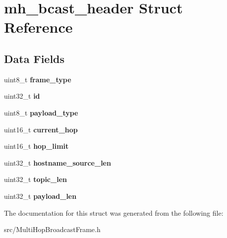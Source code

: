 \hypertarget{structmh__bcast__header}{\section{mh\-\_\-bcast\-\_\-header Struct Reference}
\label{structmh__bcast__header}
}
\subsection*{Data Fields}
\begin{DoxyCompactItemize}
\item 
\hypertarget{structmh__bcast__header_a645bc6e0f599ba87f09b808c7d132d68}{uint8\-\_\-t {\bfseries frame\-\_\-type}}\label{structmh__bcast__header_a645bc6e0f599ba87f09b808c7d132d68}

\item 
\hypertarget{structmh__bcast__header_aae2a3d39f8f9fa5b357e9689bc4d170c}{uint32\-\_\-t {\bfseries id}}\label{structmh__bcast__header_aae2a3d39f8f9fa5b357e9689bc4d170c}

\item 
\hypertarget{structmh__bcast__header_af389a933a7cd120045ff9241258b9eb6}{uint8\-\_\-t {\bfseries payload\-\_\-type}}\label{structmh__bcast__header_af389a933a7cd120045ff9241258b9eb6}

\item 
\hypertarget{structmh__bcast__header_aa6a1428ebcbe730f935205bdbbb3ed63}{uint16\-\_\-t {\bfseries current\-\_\-hop}}\label{structmh__bcast__header_aa6a1428ebcbe730f935205bdbbb3ed63}

\item 
\hypertarget{structmh__bcast__header_a7554ca13a6890da26c5fb5d1f31550ea}{uint16\-\_\-t {\bfseries hop\-\_\-limit}}\label{structmh__bcast__header_a7554ca13a6890da26c5fb5d1f31550ea}

\item 
\hypertarget{structmh__bcast__header_ad9b04518fb7586258e0e9bb73a5f0275}{uint32\-\_\-t {\bfseries hostname\-\_\-source\-\_\-len}}\label{structmh__bcast__header_ad9b04518fb7586258e0e9bb73a5f0275}

\item 
\hypertarget{structmh__bcast__header_a7999a82698db4ab8b7da051d5546427e}{uint32\-\_\-t {\bfseries topic\-\_\-len}}\label{structmh__bcast__header_a7999a82698db4ab8b7da051d5546427e}

\item 
\hypertarget{structmh__bcast__header_a2afe2d8d8e3616e060718af5743b3dc7}{uint32\-\_\-t {\bfseries payload\-\_\-len}}\label{structmh__bcast__header_a2afe2d8d8e3616e060718af5743b3dc7}

\end{DoxyCompactItemize}


The documentation for this struct was generated from the following file\-:\begin{DoxyCompactItemize}
\item 
src/Multi\-Hop\-Broadcast\-Frame.\-h\end{DoxyCompactItemize}

